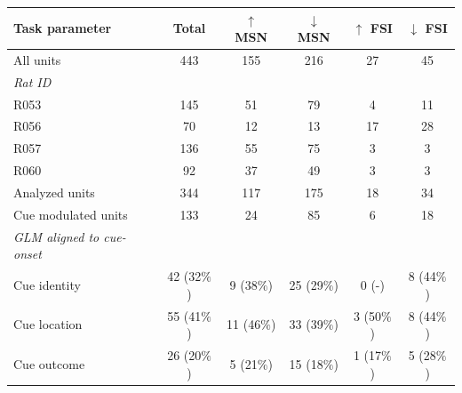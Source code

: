\documentclass[11pt]{article}
\newcommand{\bsf}[1]{\textbf{#1}}
\begin{document}
\begin{table}[p]
\centering
\setlength{\tabcolsep}{1 em} %
\begin{tabular}{l c  c c c c}

\bsf{Task parameter}                                 & \bsf{Total}        & \bsf{$\uparrow$ MSN}        & \bsf{$\downarrow$ MSN}        & \bsf{$\uparrow$ FSI}       & \bsf{$\downarrow$ FSI}\\
\hline
All units                       & 443        & 155         & 216          & 27          & 45\\
\hline
\textit{Rat ID}                       &         &       &          &          &\\
\hline
\hspace{3mm}R053                       & 145         & 51          & 79          & 4         & 11\\
\hline
\hspace{3mm}R056                       & 70         & 12          & 13         & 17          & 28\\
\hline
\hspace{3mm}R057   	          & 136         & 55          & 75          & 3          & 3\\
\hline
\hspace{3mm}R060                       & 92         & 37          & 49          & 3          & 3\\
\hline 
Analyzed units                       & 344        & 117         & 175         & 18         & 34\\
\hline
Cue modulated units                      & 133         &24          &85          & 6          &18\\
\hline
\hspace{3mm}\textit{GLM aligned to cue-onset}                       &         &       &          &          &\\
\hline
\hspace{6mm}Cue identity       & 42 (32$\%$)        & 9 (38$\%$)          & 25 (29$\%$)          & 0 (-)          & 8 (44$\%$)\\
\hline
\hspace{6mm}Cue location       & 55 (41$\%$)       & 11 (46$\%$)          & 33 (39$\%$)          & 3 (50$\%$)          & 8 (44$\%$)\\
\hline
\hspace{6mm}Cue outcome       & 26 (20$\%$)         & 5 (21$\%$)          & 15 (18$\%$)        & 1 (17$\%$)          & 5 (28$\%$)\\

\end{tabular}
\end{table}
\end{document}
